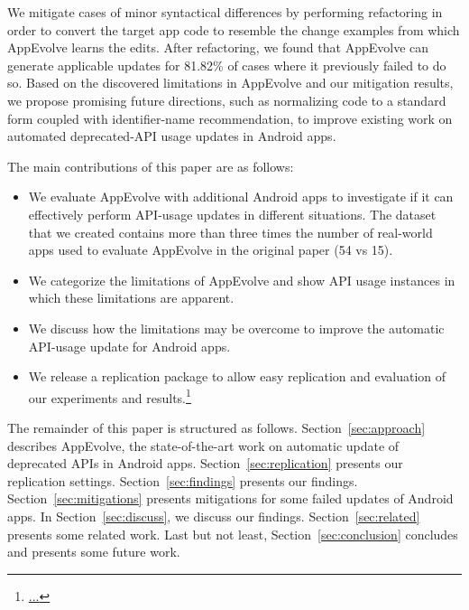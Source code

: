 We mitigate cases of minor syntactical differences by performing refactoring in order to convert the target app code to resemble the change examples from which AppEvolve learns the edits.
After refactoring, we found that AppEvolve can generate applicable updates for 81.82\% of cases where it previously failed to do so.
Based on the discovered limitations in AppEvolve and our mitigation results, we propose promising future directions, such as normalizing code to a standard form coupled with identifier-name recommendation, to improve existing work on automated deprecated-API usage updates in Android apps.

The main contributions of this paper are as follows:
\begin{itemize}
	\item We  evaluate AppEvolve with additional Android apps to investigate if it can effectively perform API-usage updates in different situations. The dataset that we created contains more than three times the number of real-world apps used to evaluate AppEvolve in the original paper (54 vs 15).
	\item We categorize the limitations of AppEvolve and show API usage instances in which these limitations are apparent.
	\item We discuss how the limitations may be overcome to improve the automatic API-usage update for Android apps.
	\item We release a replication package to allow easy replication and evaluation of our experiments and results.\footnote{\url{...}}
\end{itemize}

The remainder of this paper is structured as follows. Section~\ref{sec:approach} describes AppEvolve, the state-of-the-art work on automatic update of deprecated APIs in Android apps. Section~\ref{sec:replication} presents our replication settings. Section~\ref{sec:findings} presents our findings. Section~\ref{sec:mitigations} presents mitigations for some failed updates of Android apps. In Section~\ref{sec:discuss}, we discuss our findings. Section~\ref{sec:related} presents some related work. Last but not least, Section~\ref{sec:conclusion} concludes and presents some future work.
